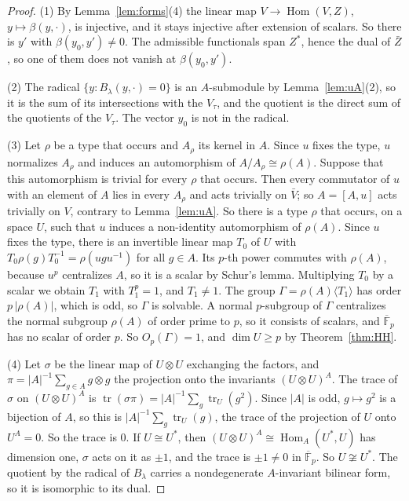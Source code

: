 \documentclass[11pt]{amsart}
\theoremstyle{definition}
\theoremstyle{remark}
\newcommand{\F}{\mathbb{F}}
\newcommand{\tr}{\operatorname{tr}}
\newcommand{\Kb}{\overline{\F}_p}
\begin{document}
\begin{proof}
(1) By Lemma~\ref{lem:forms}(4) the linear map $V\to\operatorname{Hom}(V,Z)$, $y\mapsto\beta(y,\cdot)$, is injective, and it stays injective after extension of scalars. So there is $y'$ with $\beta(y_0,y')\ne0$. The admissible functionals span $Z^*$, hence the dual of $\bar Z$, so one of them does not vanish at $\beta(y_0,y')$.

(2) The radical $\{y:B_\lambda(y,\cdot)=0\}$ is an $A$-submodule by Lemma~\ref{lem:uA}(2), so it is the sum of its intersections with the $V_\tau$, and the quotient is the direct sum of the quotients of the $V_\tau$. The vector $y_0$ is not in the radical.

(3) Let $\rho$ be a type that occurs and $A_\rho$ its kernel in $A$. Since $u$ fixes the type, $u$ normalizes $A_\rho$ and induces an automorphism of $A/A_\rho\cong\rho(A)$. Suppose that this automorphism is trivial for every $\rho$ that occurs. Then every commutator of $u$ with an element of $A$ lies in every $A_\rho$ and acts trivially on $\bar V$; so $A=[A,u]$ acts trivially on $V$, contrary to Lemma~\ref{lem:uA}. So there is a type $\rho$ that occurs, on a space $U$, such that $u$ induces a non-identity automorphism of $\rho(A)$. Since $u$ fixes the type, there is an invertible linear map $T_0$ of $U$ with $T_0\rho(g)T_0^{-1}=\rho(ugu^{-1})$ for all $g\in A$. Its $p$-th power commutes with $\rho(A)$, because $u^p$ centralizes $A$, so it is a scalar by Schur's lemma. Multiplying $T_0$ by a scalar we obtain $T_1$ with $T_1^p=1$, and $T_1\ne1$. The group $\Gamma=\rho(A)\langle T_1\rangle$ has order $p\,|\rho(A)|$, which is odd, so $\Gamma$ is solvable. A normal $p$-subgroup of $\Gamma$ centralizes the normal subgroup $\rho(A)$ of order prime to $p$, so it consists of scalars, and $\Kb$ has no scalar of order $p$. So $O_p(\Gamma)=1$, and $\dim U\ge p$ by Theorem~\ref{thm:HH}.

(4) Let $\sigma$ be the linear map of $U\otimes U$ exchanging the factors, and $\pi=|A|^{-1}\sum_{g\in A}g\otimes g$ the projection onto the invariants $(U\otimes U)^A$. The trace of $\sigma$ on $(U\otimes U)^A$ is $\tr(\sigma\pi)=|A|^{-1}\sum_g\tr_U(g^2)$. Since $|A|$ is odd, $g\mapsto g^2$ is a bijection of $A$, so this is $|A|^{-1}\sum_g\tr_U(g)$, the trace of the projection of $U$ onto $U^A=0$. So the trace is $0$. If $U\cong U^*$, then $(U\otimes U)^A\cong\operatorname{Hom}_A(U^*,U)$ has dimension one, $\sigma$ acts on it as $\pm1$, and the trace is $\pm1\ne0$ in $\Kb$. So $U\not\cong U^*$. The quotient by the radical of $B_\lambda$ carries a nondegenerate $A$-invariant bilinear form, so it is isomorphic to its dual.
\end{proof}
\end{document}
